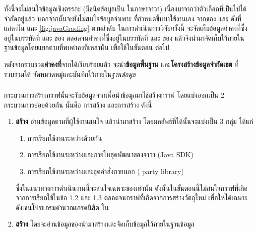 ทั้งนี้จะไม่สนใจข้อมูลเชิงตรรกะ (มีชนิดข้อมูลเป็น  ในภาษาจาวา) เนื่องมาจากว่าตัวเลือกที่เป็นไปได้จำกัดอยู่แล้ว 
นอกจากนั้นจะยังไม่สนใจข้อมูลจำเพาะ ที่กำหนดขึ้นมาใช้งานเอง 
จาก{\sourcecode}ของ{\class}  และ ดังที่แสดงใน 
 และ \ref{fig:javaGrading} ตามลำดับ ในการดำเนินการวิจัยครั้งนี้ 
จะจัดเก็บข้อมูลค่าคงที่ซึ่งอยู่ในบรรทัดที่  และ  ของ{\class} 
ตลอดจนค่าคงที่ซึ่งอยู่ในบรรทัดที่  และ  ของ{\class}  
แล้วจึงนำมาจัดเก็บไว้ภายในฐานข้อมูลโดยแยกตาม{\class}ที่พบค่าคงที่เหล่านั้น เพื่อใช้ในขั้นตอน {\bf \testcaseGeneration} ต่อไป

หลังจากรวบรวม{\bf ค่าคงที่}จาก{\sourcecode}ได้เรียบร้อยแล้ว จะนำ{\bf ข้อมูลพื้นฐาน} และ{\bf โครงสร้างข้อมูลจำกัดเขต} ที่รวบรวมได้
จัดหมวดหมู่และบันทึกไว้ภายใน{\it ฐานข้อมูล}

\subsubsection{\graphCreation}
\label{sec:sub:sub:graphCreation}

กระบวนการสร้างกราฟนั้นจะรับข้อมูล{\sourcecode}จาก{\Repository}เพื่อนำข้อมูลมาใช้สร้างกราฟ โดยแบ่งออกเป็น 2 กระบวนการย่อยด้วยกัน 
นั้นคือ การสร้าง{\scg} และการสร้าง{\cfg} ดังนี้

\begin{enumerate}
    \item {\bf สร้าง{\scg}} อ่านข้อมูล{\CUT}ตามที่ผู้ใช้งานสนใจ แล้วนำมาสร้าง{\scg} โดยผลลัพธ์ที่ได้นั้นจะแบ่งเป็น 3 กลุ่ม ได้แก่
        \begin{enumerate}
            \item การเรียกใช้งานระหว่าง{\CUT}ด้วยกัน \label{ord:scgcut} 
            \item การเรียกใช้งานระหว่าง{\CUT}และ{\class}ภายในชุดพัฒนาของจาวา (Java SDK) \label{ord:scgjdk} 
            \item การเรียกใช้งานระหว่าง{\CUT}และชุดคำสั่งภายนอก ( party library) \label{ord:scg3rd} 
        \end{enumerate}
        ซึ่งในแนวทางการดำเนินงานนี้จะสนใจเฉพาะ{\scg}ของ{\CUT}เท่านั้น ดังนั้นในขั้นตอนนี้ไม่สนใจกราฟที่เกิดจากการเรียกใช้ในข้อ 1.2
        และ 1.3 ตลอดจนกราฟที่เกิดจากการสร้างวัตถุใหม่ เพื่อให้ได้{\scg}เฉพาะ{\CUT} ดังเช่น{\scg}โปรแกรมคํานวณเกรดนิสิต ใน

    \item {\bf สร้าง{\cfg}} โดยจะอ่านข้อมูลของ{\CUT}นำมาสร้าง{\cfg}และจัดเก็บข้อมูลไว้ภายในฐานข้อมูล
\end{enumerate}


